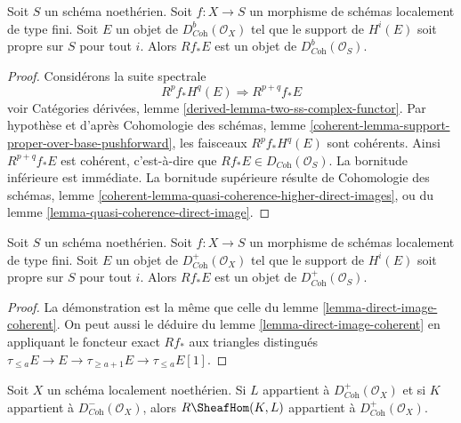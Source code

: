 \begin{lemma}
\label{lemma-direct-image-coherent}
Soit $S$ un schéma noethérien. Soit $f : X \to S$ un morphisme de schémas
localement de type fini. Soit $E$ un objet de
$D^b_{\textit{Coh}}(\mathcal{O}_X)$ tel que le support de $H^i(E)$
soit propre sur $S$ pour tout $i$.
Alors $Rf_*E$ est un objet de $D^b_{\textit{Coh}}(\mathcal{O}_S)$.
\end{lemma}

\begin{proof}
Considérons la suite spectrale
$$
R^pf_*H^q(E) \Rightarrow R^{p + q}f_*E
$$
voir Catégories dérivées, lemme \ref{derived-lemma-two-ss-complex-functor}.
Par hypothèse et d'après
Cohomologie des schémas, lemme
\ref{coherent-lemma-support-proper-over-base-pushforward},
les faisceaux $R^pf_*H^q(E)$ sont cohérents. Ainsi
$R^{p + q}f_*E$ est cohérent, c'est-à-dire que $Rf_*E \in D_{\textit{Coh}}(\mathcal{O}_S)$.
La bornitude inférieure est immédiate. La bornitude supérieure
résulte de
Cohomologie des schémas, lemme
\ref{coherent-lemma-quasi-coherence-higher-direct-images},
ou du
lemme \ref{lemma-quasi-coherence-direct-image}.
\end{proof}

\begin{lemma}
\label{lemma-direct-image-coherent-bdd-below}
Soit $S$ un schéma noethérien. Soit $f : X \to S$ un morphisme de schémas
localement de type fini. Soit $E$ un objet de
$D^+_{\textit{Coh}}(\mathcal{O}_X)$ tel que le support de $H^i(E)$
soit propre sur $S$ pour tout $i$.
Alors $Rf_*E$ est un objet de $D^+_{\textit{Coh}}(\mathcal{O}_S)$.
\end{lemma}

\begin{proof}
La démonstration est la même que celle du
lemme \ref{lemma-direct-image-coherent}.
On peut aussi le déduire du
lemme \ref{lemma-direct-image-coherent}
en appliquant le foncteur exact $Rf_*$ aux
triangles distingués
$\tau_{\leq a}E \to E \to \tau_{\geq a + 1}E \to \tau_{\leq a}E[1]$.
\end{proof}

\begin{lemma}
\label{lemma-coherent-internal-hom}
Soit $X$ un schéma localement noethérien. Si $L$ appartient à
$D^+_{\textit{Coh}}(\mathcal{O}_X)$ et si $K$ appartient à
$D^-_{\textit{Coh}}(\mathcal{O}_X)$, alors
$R\SheafHom(K, L)$ appartient à $D^+_{\textit{Coh}}(\mathcal{O}_X)$.
\end{lemma}

